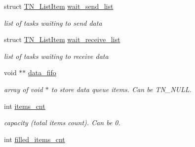 \begin{DoxyCompactItemize}
\item 
\hypertarget{structTN__DQueue_a5094327a117b22df9d3b09ee45204c62}{struct \hyperlink{structTN__ListItem}{T\+N\+\_\+\+List\+Item} \hyperlink{structTN__DQueue_a5094327a117b22df9d3b09ee45204c62}{wait\+\_\+send\+\_\+list}}\label{structTN__DQueue_a5094327a117b22df9d3b09ee45204c62}

\begin{DoxyCompactList}\small\item\em list of tasks waiting to send data \end{DoxyCompactList}\item 
\hypertarget{structTN__DQueue_a2cb2cfdd31937d5d121a72b4e2ee6f1b}{struct \hyperlink{structTN__ListItem}{T\+N\+\_\+\+List\+Item} \hyperlink{structTN__DQueue_a2cb2cfdd31937d5d121a72b4e2ee6f1b}{wait\+\_\+receive\+\_\+list}}\label{structTN__DQueue_a2cb2cfdd31937d5d121a72b4e2ee6f1b}

\begin{DoxyCompactList}\small\item\em list of tasks waiting to receive data \end{DoxyCompactList}\item 
\hypertarget{structTN__DQueue_aba382885049d3df6ed8dbb8736ced1ad}{void $\ast$$\ast$ \hyperlink{structTN__DQueue_aba382885049d3df6ed8dbb8736ced1ad}{data\+\_\+fifo}}\label{structTN__DQueue_aba382885049d3df6ed8dbb8736ced1ad}

\begin{DoxyCompactList}\small\item\em array of {\ttfamily void $\ast$} to store data queue items. Can be {\ttfamily T\+N\+\_\+\+N\+U\+L\+L}. \end{DoxyCompactList}\item 
\hypertarget{structTN__DQueue_a1c0167117cef4412bbbac2aff3334e7b}{int \hyperlink{structTN__DQueue_a1c0167117cef4412bbbac2aff3334e7b}{items\+\_\+cnt}}\label{structTN__DQueue_a1c0167117cef4412bbbac2aff3334e7b}

\begin{DoxyCompactList}\small\item\em capacity (total items count). Can be 0. \end{DoxyCompactList}\item 
\hypertarget{structTN__DQueue_a536190a17aff0355de36d8d68aa7d98c}{int \hyperlink{structTN__DQueue_a536190a17aff0355de36d8d68aa7d98c}{filled\+\_\+items\+\_\+cnt}}\label{structTN__DQueue_a536190a17aff0355de36d8d68aa7d98c}


\end{DoxyCompactItemize}
